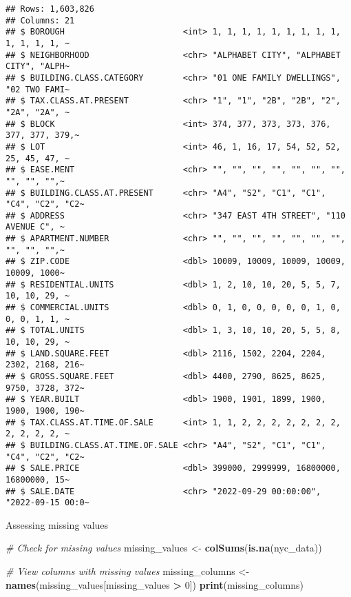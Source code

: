 \documentclass[
]{article}
\newenvironment{Shaded}{\begin{snugshade}}{\end{snugshade}}
\newcommand{\CommentTok}[1]{\textcolor[rgb]{0.56,0.35,0.01}{\textit{#1}}}
\newcommand{\DecValTok}[1]{\textcolor[rgb]{0.00,0.00,0.81}{#1}}
\newcommand{\FunctionTok}[1]{\textcolor[rgb]{0.13,0.29,0.53}{\textbf{#1}}}
\newcommand{\NormalTok}[1]{#1}
\newcommand{\OtherTok}[1]{\textcolor[rgb]{0.56,0.35,0.01}{#1}}
\newcommand{\SpecialCharTok}[1]{\textcolor[rgb]{0.81,0.36,0.00}{\textbf{#1}}}
\begin{document}
\begin{verbatim}
## Rows: 1,603,826
## Columns: 21
## $ BOROUGH                        <int> 1, 1, 1, 1, 1, 1, 1, 1, 1, 1, 1, 1, 1, ~
## $ NEIGHBORHOOD                   <chr> "ALPHABET CITY", "ALPHABET CITY", "ALPH~
## $ BUILDING.CLASS.CATEGORY        <chr> "01 ONE FAMILY DWELLINGS", "02 TWO FAMI~
## $ TAX.CLASS.AT.PRESENT           <chr> "1", "1", "2B", "2B", "2", "2A", "2A", ~
## $ BLOCK                          <int> 374, 377, 373, 373, 376, 377, 377, 379,~
## $ LOT                            <int> 46, 1, 16, 17, 54, 52, 52, 25, 45, 47, ~
## $ EASE.MENT                      <chr> "", "", "", "", "", "", "", "", "", "",~
## $ BUILDING.CLASS.AT.PRESENT      <chr> "A4", "S2", "C1", "C1", "C4", "C2", "C2~
## $ ADDRESS                        <chr> "347 EAST 4TH STREET", "110 AVENUE C", ~
## $ APARTMENT.NUMBER               <chr> "", "", "", "", "", "", "", "", "", "",~
## $ ZIP.CODE                       <dbl> 10009, 10009, 10009, 10009, 10009, 1000~
## $ RESIDENTIAL.UNITS              <dbl> 1, 2, 10, 10, 20, 5, 5, 7, 10, 10, 29, ~
## $ COMMERCIAL.UNITS               <dbl> 0, 1, 0, 0, 0, 0, 0, 1, 0, 0, 0, 1, 1, ~
## $ TOTAL.UNITS                    <dbl> 1, 3, 10, 10, 20, 5, 5, 8, 10, 10, 29, ~
## $ LAND.SQUARE.FEET               <dbl> 2116, 1502, 2204, 2204, 2302, 2168, 216~
## $ GROSS.SQUARE.FEET              <dbl> 4400, 2790, 8625, 8625, 9750, 3728, 372~
## $ YEAR.BUILT                     <dbl> 1900, 1901, 1899, 1900, 1900, 1900, 190~
## $ TAX.CLASS.AT.TIME.OF.SALE      <int> 1, 1, 2, 2, 2, 2, 2, 2, 2, 2, 2, 2, 2, ~
## $ BUILDING.CLASS.AT.TIME.OF.SALE <chr> "A4", "S2", "C1", "C1", "C4", "C2", "C2~
## $ SALE.PRICE                     <dbl> 399000, 2999999, 16800000, 16800000, 15~
## $ SALE.DATE                      <chr> "2022-09-29 00:00:00", "2022-09-15 00:0~
\end{verbatim}

Assessing missing values

\begin{Shaded}
\begin{Highlighting}[]
\CommentTok{\# Check for missing values}
\NormalTok{missing\_values }\OtherTok{\textless{}{-}} \FunctionTok{colSums}\NormalTok{(}\FunctionTok{is.na}\NormalTok{(nyc\_data))}

\CommentTok{\# View columns with missing values}
\NormalTok{missing\_columns }\OtherTok{\textless{}{-}} \FunctionTok{names}\NormalTok{(missing\_values[missing\_values }\SpecialCharTok{\textgreater{}} \DecValTok{0}\NormalTok{])}
\FunctionTok{print}\NormalTok{(missing\_columns)}
\end{Highlighting}
\end{Shaded}
\end{document}

